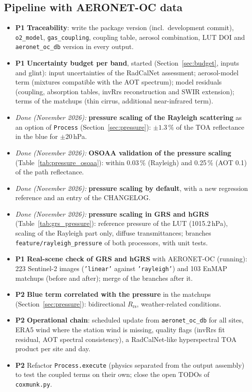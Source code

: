\documentclass[11pt,a4paper]{article}
\newcommand{\Rrs}{R_\mathrm{rs}}
\newcommand{\code}[1]{\texttt{#1}}
\newcommand{\prio}[1]{\textbf{\textcolor{blue!50!black}{#1}}}
\begin{document}
\subsection{Pipeline with AERONET-OC data}
\label{sec:pipeline}
\begin{itemize}
\item \prio{P1} \textbf{Traceability}: write the package version (incl.\ development commit), \code{o2\_model},
  \code{gas\_coupling}, coupling table, aerosol combination, LUT DOI and \code{aeronet\_oc\_db} version in every output.
\item \prio{P1} \textbf{Uncertainty budget per band}, started (Section~\ref{sec:budget}, inputs and glint): input
  uncertainties of the RadCalNet assessment; aerosol-model term (mixtures compatible with the AOT spectrum); model
  residuals (coupling, absorption tables, invRrs reconstruction and SWIR extension); terms of the matchups (thin
  cirrus, additional near-infrared term).
\item \textit{Done (November 2026):} \textbf{pressure scaling of the Rayleigh scattering} as an option of
  \code{Process} (Section~\ref{sec:pressure}): $\pm1.3\,\%$ of the TOA reflectance in the blue for $\pm20$\,hPa.
\item \textit{Done (November 2026):} \textbf{OSOAA validation of the pressure scaling}
  (Table~\ref{tab:pressure_osoaa}): within 0.03\,\% (Rayleigh) and 0.25\,\% (AOT 0.1) of the path reflectance.
\item \textit{Done (November 2026):} \textbf{pressure scaling by default}, with a new regression reference and an
  entry of the CHANGELOG.
\item \textit{Done (November 2026):} \textbf{pressure scaling in GRS and hGRS} (Table~\ref{tab:grs_pressure}):
  reference pressure of the LUT (1015.2\,hPa), scaling of the Rayleigh part only, diffuse transmittances; branches
  \code{feature/rayleigh\_pressure} of both processors, with unit tests.
\item \prio{P1} \textbf{Real-scene check of GRS and hGRS} with AERONET-OC (running): 223 Sentinel-2 images
  (\code{'linear'} against \code{'rayleigh'}) and 103 EnMAP matchups (before and after); merge of the branches after it.
\item \prio{P2} \textbf{Blue term correlated with the pressure} in the matchups (Section~\ref{sec:pressure}):
  bidirectional $\Rrs$, weather-related conditions.
\item \prio{P2} \textbf{Operational chain}: scheduled update from \code{aeronet\_oc\_db} for all sites, ERA5 wind
  where the station wind is missing, quality flags (invRrs fit residual, AOT spectral consistency), a
  RadCalNet-like hyperspectral TOA product per site and day.
\item \prio{P2} Refactor \code{Process.execute} (physics separated from the output assembly) to test the coupled
  terms on their own; close the open TODOs of \code{coxmunk.py}.
\end{itemize}
\end{document}
